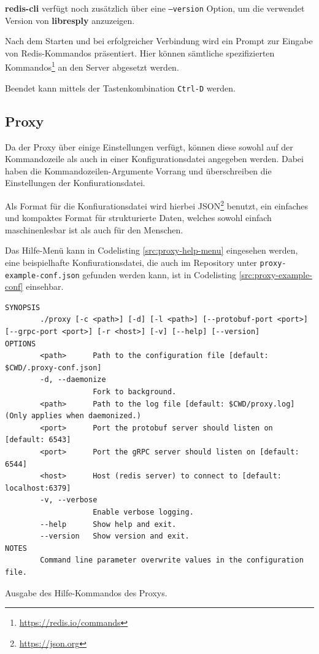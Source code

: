 \documentclass[a4paper,ngerman]{article}
\begin{document}
{\textbf{redis-cli} verfügt noch zusätzlich über eine \texttt{--version} Option, um die verwendet Version von \textbf{libresply} anzuzeigen.

Nach dem Starten und bei erfolgreicher Verbindung wird ein Prompt zur Eingabe von Redis-Kommandos präsentiert. Hier können sämtliche spezifizierten Kommandos\footnote{\url{https://redis.io/commands}} an den Server abgesetzt werden.

Beendet kann mittels der Tastenkombination \texttt{Ctrl-D} werden.

\subsection{Proxy}
Da der Proxy über einige Einstellungen verfügt, können diese sowohl auf der Kommandozeile als auch in einer Konfigurationsdatei angegeben werden. Dabei haben die Kommandozeilen-Argumente Vorrang und überschreiben die Einstellungen der Konfiurationsdatei.

Als Format für die Konfiurationsdatei wird hierbei JSON\footnote{\url{https://json.org}} benutzt, ein einfaches und kompaktes Format für strukturierte Daten, welches sowohl einfach maschinenlesbar ist als auch für den Menschen.

Das Hilfe-Menü kann in Codelisting \ref{src:proxy-help-menu} eingesehen werden, eine beispielhafte Konfiurationsdatei, die auch im Repository unter \texttt{proxy-example-conf.json} gefunden werden kann, ist in Codelisting \ref{src:proxy-example-conf} einsehbar.

\begin{listing}[H]
        \begin{verbatim}
SYNOPSIS
        ./proxy [-c <path>] [-d] [-l <path>] [--protobuf-port <port>] [--grpc-port <port>] [-r <host>] [-v] [--help] [--version]
OPTIONS
        <path>      Path to the configuration file [default: $CWD/.proxy-conf.json]
        -d, --daemonize
                    Fork to background.
        <path>      Path to the log file [default: $CWD/proxy.log] (Only applies when daemonized.)
        <port>      Port the protobuf server should listen on [default: 6543]
        <port>      Port the gRPC server should listen on [default: 6544]
        <host>      Host (redis server) to connect to [default: localhost:6379]
        -v, --verbose
                    Enable verbose logging.
        --help      Show help and exit.
        --version   Show version and exit.
NOTES
        Command line parameter overwrite values in the configuration file.
        \end{verbatim}
        \label{src:proxy-help-menu}
        \caption{Ausgabe des Hilfe-Kommandos des Proxys.}
\end{listing}

}
\end{document}
